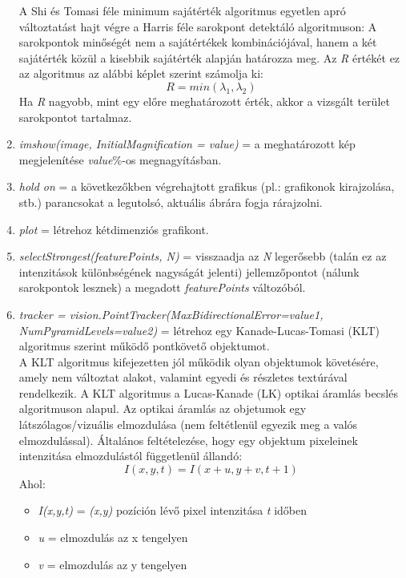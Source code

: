 \documentclass[12pt]{report}
\begin{document}
\begin{enumerate}
                    A Shi és Tomasi féle minimum sajátérték algoritmus egyetlen apró változtatást hajt végre a Harris féle sarokpont detektáló algoritmuson: A sarokpontok minőségét nem a sajátértékek kombinációjával, hanem a két sajátérték közül a kisebbik sajátérték alapján határozza meg. Az \textit{R} értékét ez az algoritmus az alábbi képlet szerint számolja ki:
                    \[R = min(\lambda_1, \lambda_2)\]
                    Ha \textit{R} nagyobb, mint egy előre meghatározott érték, akkor a vizsgált terület sarokpontot tartalmaz.
                    \item \textit{imshow(image, InitialMagnification = value)} = a meghatározott kép megjelenítése \textit{value}\%-os megnagyításban.
                    \item \textit{hold on} = a következőkben végrehajtott grafikus (pl.: grafikonok kirajzolása, stb.) parancsokat a legutolsó, aktuális ábrára fogja rárajzolni.
                    \item \textit{plot} = létrehoz kétdimenziós grafikont.
                    \item \textit{selectStrongest(featurePoints, N)} = visszaadja az \textit{N} legerősebb (talán ez az intenzitások különbségének nagyságát jelenti) jellemzőpontot (nálunk sarokpontok lesznek) a megadott \textit{featurePoints} változóból.
                    \item \textit{tracker = vision.PointTracker(MaxBidirectionalError=value1, NumPyramidLevels=value2)} = létrehoz egy Kanade-Lucas-Tomasi (KLT) algoritmus szerint működő pontkövető objektumot.\\
                    A KLT algoritmus kifejezetten jól működik olyan objektumok követésére, amely nem változtat alakot, valamint egyedi és részletes textúrával rendelkezik. A KLT algoritmus a Lucas-Kanade (LK) optikai áramlás becslés algoritmuson alapul. Az optikai áramlás az objetumok egy látszólagos/vizuális elmozdulása (nem feltétlenül egyezik meg a valós elmozdulással). Általános feltételezése, hogy egy objektum pixeleinek intenzitása elmozdulástól függetlenül állandó:
                    \[I(x,y,t) = I(x + u,y + v,t + 1)\]
                    Ahol:
                    \begin{itemize}
                        \item \textit{I(x,y,t)} = \textit{(x,y)} pozíción lévő pixel intenzitása \textit{t} időben
                        \item \textit{u} = elmozdulás az x tengelyen
                        \item \textit{v} = elmozdulás az y tengelyen
                    \end{itemize}


\end{enumerate}
\end{document}
